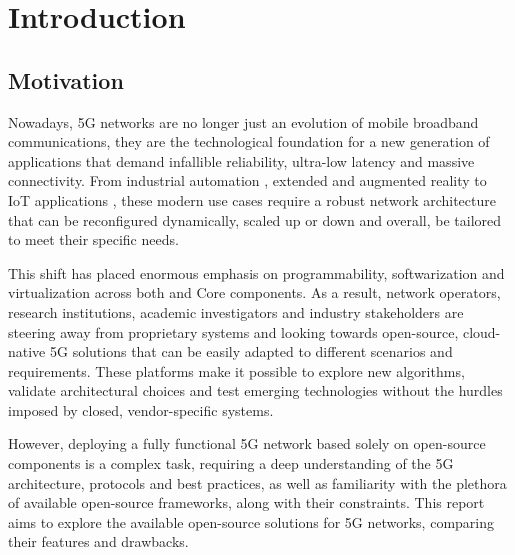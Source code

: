 
%

\chapter{Introduction}
\label{cha:introduction}

\section{Motivation}
\label{sec:motivation}
Nowadays, 5G networks are no longer just an evolution of mobile broadband communications, they are the technological foundation for a new generation of applications that demand infallible reliability, ultra-low latency and massive connectivity. From industrial automation \cites{13-electronics11030412}{brown2018ultrareliable}{Khujamatov2021}, extended and augmented reality \cites{LV2020158}{9363323}{16-TorresVega2020} to \gls{IoT} applications \cites{7835795}{LV2020158}{16-TorresVega2020}{8519960}, these modern use cases require a robust network architecture that can be reconfigured dynamically, scaled up or down and overall, be tailored to meet their specific needs. 

This shift has placed enormous emphasis on programmability, softwarization and virtualization across both  and Core components. As a result, network operators, research institutions, academic investigators and industry stakeholders are steering away from proprietary systems and looking towards open-source, cloud-native 5G solutions that can be easily adapted to different scenarios and requirements. These platforms make it possible to explore new algorithms, validate architectural choices and test emerging technologies without the hurdles imposed by closed, vendor-specific systems.

However, deploying a fully functional 5G network based solely on open-source components is a complex task, requiring a deep understanding of the 5G architecture, protocols and best practices, as well as familiarity with the plethora of available open-source frameworks, along with their constraints. This report aims to explore the available open-source solutions for 5G networks, comparing their features and drawbacks. 

